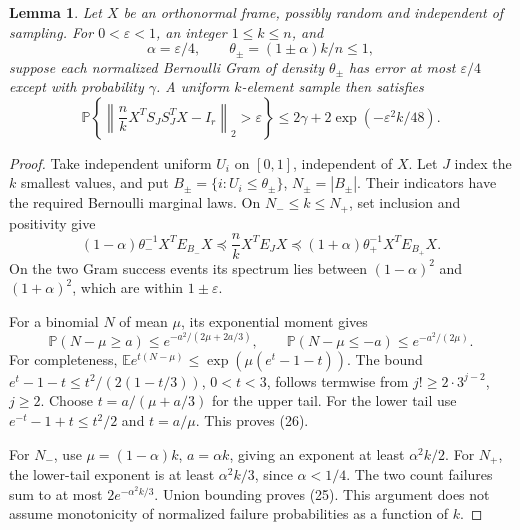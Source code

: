 \documentclass[11pt]{article}
\newtheorem{lemma}[theorem]{Lemma}
\theoremstyle{definition}
\newcommand{\E}{\mathbb E}
\newcommand{\Prob}{\mathbb P}
\newcommand{\norm}[1]{\left\lVert#1\right\rVert_2}
\begin{document}
\begin{lemma}\label{lem:sampling}
Let \(X\) be an orthonormal frame, possibly random and independent
of sampling. For \(0<\varepsilon<1\), an integer \(1\le k\le n\),
and
\[
 \alpha=\varepsilon/4,\qquad
 \theta_\pm=(1\pm\alpha)k/n\le1,
\]
suppose each normalized Bernoulli Gram of density \(\theta_\pm\)
has error at most \(\varepsilon/4\) except with probability
\(\gamma\). A uniform \(k\)-element sample then satisfies
\[
 \Prob\left\{\norm{\frac nk X^TS_JS_J^TX-I_r}>\varepsilon\right\}
 \le2\gamma+2\exp(-\varepsilon^2 k/48).                           \tag{25}
\]
\end{lemma}
\begin{proof}
Take independent uniform \(U_i\) on \([0,1]\), independent of \(X\).
Let \(J\) index the \(k\) smallest values, and put
\(B_\pm=\{i:U_i\le\theta_\pm\}\), \(N_\pm=|B_\pm|\).
Their indicators have the required Bernoulli marginal laws.
On \(N_-\le k\le N_+\), set inclusion and positivity give
\[
 (1-\alpha)\theta_-^{-1}X^TE_{B_-}X
 \preceq \frac nkX^TE_JX
 \preceq (1+\alpha)\theta_+^{-1}X^TE_{B_+}X.
\]
On the two Gram success events its spectrum lies between
\((1-\alpha)^2\) and \((1+\alpha)^2\), which are within
\(1\pm\varepsilon\).

For a binomial \(N\) of mean \(\mu\), its exponential moment gives
\[
 \Prob(N-\mu\ge a)\le e^{-a^2/(2\mu+2a/3)},\qquad
 \Prob(N-\mu\le-a)\le e^{-a^2/(2\mu)}.                            \tag{26}
\]
For completeness,
\(\E e^{t(N-\mu)}\le\exp(\mu(e^t-1-t))\).
The bound \(e^t-1-t\le t^2/(2(1-t/3))\), \(0<t<3\),
follows termwise from \(j!\ge2\cdot3^{j-2}\), \(j\ge2\).
Choose \(t=a/(\mu+a/3)\) for the upper tail.
For the lower tail use \(e^{-t}-1+t\le t^2/2\) and \(t=a/\mu\).
This proves (26).

For \(N_-\), use \(\mu=(1-\alpha)k\), \(a=\alpha k\), giving
an exponent at least \(\alpha^2k/2\). For \(N_+\), the lower-tail
exponent is at least \(\alpha^2k/3\), since \(\alpha<1/4\).
The two count failures sum to at most
\(2e^{-\alpha^2k/3}\). Union bounding proves (25).
This argument does not assume monotonicity of normalized failure
probabilities as a function of \(k\).
\end{proof}
\end{document}
